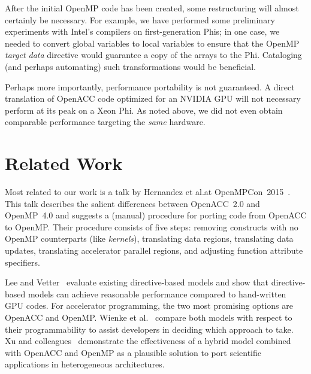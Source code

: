 \documentclass{sig-alternate-05-2015}
\begin{document}
After the initial OpenMP code has been created, some restructuring will almost
certainly be necessary.  For example, we have performed some preliminary
experiments with Intel's compilers on first-generation Phis; in one case, we
needed to convert global variables to local variables to ensure that the OpenMP
\emph{target data} directive would guarantee a copy of the arrays to the Phi.
Cataloging (and perhaps automating) such transformations would be beneficial.

Perhaps more importantly, performance portability is not guaranteed.  A direct
translation of OpenACC code optimized for an NVIDIA GPU will not necessary
perform at its peak on a Xeon Phi.  As noted above, we did not even obtain
comparable performance targeting the
\emph{same} hardware.

\section{Related Work}

Most related to our work is a talk by Hernandez et al.\@ at
OpenMPCon~2015~\cite{hernandez,hernandezvideo}.  This talk describes the
salient differences between OpenACC~2.0 and OpenMP~4.0 and suggests a
(manual) procedure for porting code from OpenACC to OpenMP\@.  Their procedure
consists of five steps: removing constructs with no OpenMP counterparts (like
\emph{kernels}), translating data regions, translating data updates, translating
accelerator parallel regions, and adjusting function attribute specifiers.

Lee and Vetter~\cite{lee2012early} evaluate existing directive-based models and
show that directive-based models can achieve reasonable performance compared to
hand-written GPU codes. For accelerator programming, the two most promising
options are OpenACC and OpenMP.  Wienke et al.~\cite{wienke2014pattern} compare
both models with respect to their programmability to assist developers in
deciding which approach to take.  Xu and colleagues~\cite{xu2013exploring}
demonstrate the effectiveness of a hybrid model combined with OpenACC and
OpenMP as a plausible solution to port scientific applications in heterogeneous
architectures. 

\end{document}
